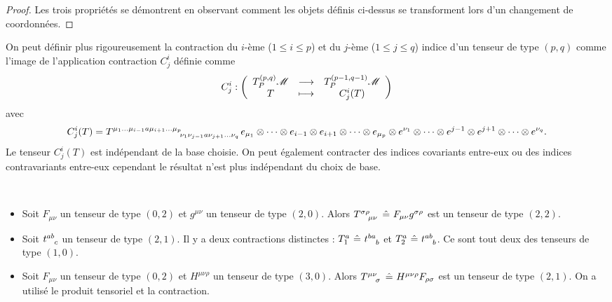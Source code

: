 \documentclass[a4paper,11pt]{report}
\begin{document}
                \begin{proof}
                    Les trois propriétés se démontrent en observant comment les objets définis ci-dessus se transforment lors d'un changement de coordonnées.
                \end{proof}
                
                \begin{rmk}
                    On peut définir plus rigoureusement la contraction du $i$-ème ($1\leq i\leq p$) et du $j$-ème ($1\leq j\leq q$) indice d'un tenseur de type $(p,q)$ comme l'image de l'application contraction $C^i_j$ définie comme
                    \begin{equation}
                        C^i_j:\left(
                    \begin{array}{ccc}
                        T^{(p,q)}_P\mathscr{M} & \longrightarrow & T^{(p-1,q-1)}_P\mathscr{M} \\
                        T & \longmapsto & C^i_j(T)
                    \end{array}
                    \right)
                    \end{equation}
                    avec 
                    \begin{equation}
                        C^i_j(T) = T\indices{^{\mu_1\dots\mu_{i-1}a\mu_{i+1}\dots\mu_p}_{\nu_1\nu_{j-1}a\nu_{j+1}\dots\nu_q}} e_{\mu_1}\otimes\dots\otimes e_{i-1}\otimes  e_{i+1}\otimes\dots\otimes e_{\mu_p}\otimes e^{\nu_1}\otimes\dots\otimes e^{j-1}\otimes e^{j+1}\otimes\dots\otimes e^{\nu_q}.
                    \end{equation}
                    Le tenseur $C^i_j(T)$ est indépendant de la base choisie. On peut également contracter des indices covariants entre-eux ou des indices contravariants entre-eux cependant le résultat n'est plus indépendant du choix de base.
                \end{rmk}
                
                \begin{exmp}${}$
                    \begin{itemize}[label = \textbullet]
                        \item Soit $F_{\mu\nu}$ un tenseur de type $(0,2)$ et $g^{\mu\nu}$ un tenseur de type $(2,0)$. Alors $T\indices{^\sigma^\rho_\mu_\nu}~\hat{=}~F_{\mu\nu}g^{\sigma\rho}$ est un tenseur de type $(2,2)$.
                        \item Soit $t\indices{^a^b_c}$ un tenseur de type $(2,1)$. Il y a deux contractions distinctes : $T_1^a~\hat{=}~t\indices{^b^a_b}$ et $T_2^a~\hat{=}~t\indices{^a^b_b}$. Ce sont tout deux des tenseurs de type $(1,0)$.
                        \item Soit $F_{\mu\nu}$ un tenseur de type $(0,2)$ et $H^{\mu\nu\rho}$ un tenseur de type $(3,0)$. Alors $T\indices{^\mu^\nu_\sigma}~\hat{=}~H^{\mu\nu\rho}F_{\rho\sigma}$ est un tenseur de type $(2,1)$. On a utilisé le produit tensoriel et la contraction.
                    \end{itemize}
                \end{exmp}
                
\end{document}
